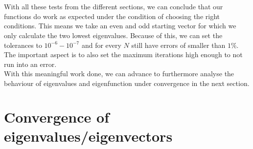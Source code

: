 \documentclass[11pt, letterpaper, onecolumn]{article}
\begin{document}
		\\
		\\
		With all these tests from the different sections, we can conclude that our functions do work as expected under the condition of choosing the right conditions. This means we take an even and odd starting vector for which we only calculate the two lowest eigenvalues. Because of this, we can set the tolerances to $10^{-6}-10^{-7}$ and for every $N$ still have errors of smaller than $1\%$. The important aspect is to also set the maximum iterations high enough to not run into an error.\\
		With this meaningful work done, we can advance to furthermore analyse the behaviour of eigenvalues and eigenfunction under convergence in the next section.
	

 
	
	\section{Convergence of eigenvalues/eigenvectors}
\end{document}
